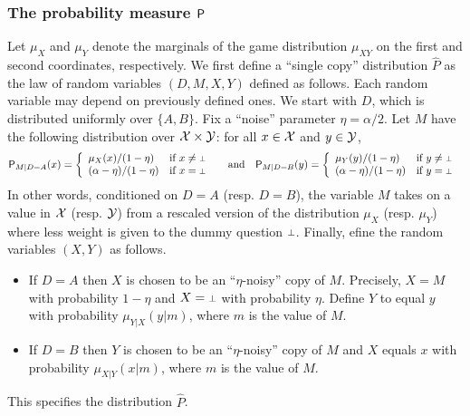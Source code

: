 

\subsubsection{The probability measure $\P$} 
Let $\mu_X$ and $\mu_Y$ denote the marginals of the game distribution $\mu_{XY}$ on the first and second coordinates, respectively. 
We first define a ``single copy'' distribution $\hat{P}$ as the law of random variables $(D,M,X,Y)$ defined as follows. Each random variable may depend on previously defined ones. We start with $D$, which is distributed uniformly over $\{A,B\}$. Fix a ``noise'' parameter $\eta = \alpha/2$. Let $M$ have the following distribution over $\X\times \Y$: for all $x \in \X$ and $y \in \Y$,
\[
	\P_{M | D = A}(x) = \left\{
	\begin{array}{ll}
		\mu_X(x)/(1 - \eta)  & \mbox{if $x \neq \dummy$} \\
		(\alpha - \eta)/(1 - \eta) & \mbox{if $x = \dummy$ }
	\end{array}
\right. \quad \text{and} \quad
	\P_{M | D = B}(y) = \left\{
	\begin{array}{ll}
		\mu_Y(y)/(1 - \eta)  & \mbox{if $y \neq \dummy$} \\
		(\alpha - \eta)/(1 - \eta) & \mbox{if $y = \dummy$ }
	\end{array}
\right.
\]
In other words, conditioned on $D=A$ (resp. $D = B$), the variable $M$ takes on a value in $\X$ (resp. $\Y$) from a rescaled version of the distribution $\mu_X$ (resp. $\mu_Y$) where less weight is given to the dummy question $\dummy$. Finally, efine the random variables $(X,Y)$ as follows. 
\begin{itemize}
	\item If $D = A$ then $X$ is chosen to be an ``$\eta$-noisy'' copy of $M$. Precisely, $X = M$ with probability $1 - \eta$ and $X = \dummy$ with probability $\eta$. Define $Y$ to equal $y$ with probability $\mu_{Y|X}(y | m)$, where $m$ is the value of $M$. 
	\item If $D = B$ then $Y$ is chosen to be an ``$\eta$-noisy'' copy of $M$ and $X$ equals $x$ with probability $\mu_{X|Y}(x | m)$, where $m$ is the value of $M$. 
\end{itemize}
This specifies the distribution $\hat{P}$. 


